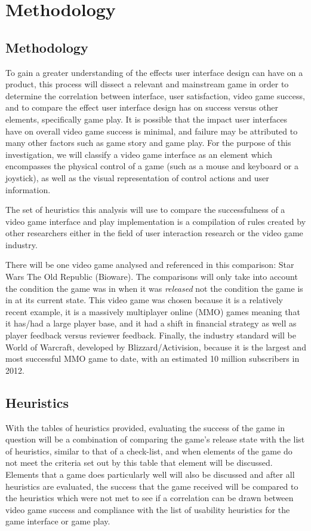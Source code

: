 \documentclass[12pt]{report}
\begin{document}
\chapter{Methodology}
\section{Methodology}
To gain a greater understanding of the effects user interface design can have on a product, this process will dissect a relevant and mainstream game in order to determine the correlation between interface, user satisfaction, video game success, and to compare the effect user interface design has on success versus other elements, specifically game play. It is possible that the impact user interfaces have on overall video game success is minimal, and failure may be attributed to many other factors such as game story and game play. For the purpose of this investigation, we will classify a video game interface as an element which encompasses the physical control of a game (such as a mouse and keyboard or a joystick), as well as the visual representation of control actions and user information\cite{Federoff}.

The set of heuristics this analysis will use to compare the successfulness of a video game interface and play implementation is a compilation of rules created by other researchers either in the field of user interaction research or the video game industry.

There will be one video game analysed and referenced in this comparison: Star Wars The Old Republic (Bioware). The comparisons will only take into account the condition the game was in when it was \textit{released} not the condition the game is in at its current state. This video game was chosen because it is a relatively recent example, it is a massively multiplayer online (MMO) games meaning that it has/had a large player base, and it had a shift in financial strategy as well as player feedback versus reviewer feedback. Finally, the industry standard will be World of Warcraft, developed by Blizzard/Activision, because it is the largest and most successful MMO game to date, with an estimated 10 million subscribers in 2012\cite{Karmali}.

\section{Heuristics}

With the tables of heuristics provided, evaluating the success of the game in question will be a combination of comparing the game's release state with the list of heuristics, similar to that of a check-list, and when elements of the game do not meet the criteria set out by this table that element will be discussed. Elements that a game does particularly well will also be discussed and after all heuristics are evaluated, the success that the game received will be compared to the heuristics which were not met to see if a correlation can be drawn between video game success and compliance with the list of usability heuristics for the game interface or game play.
\end{document}
